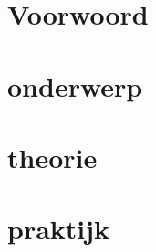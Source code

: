 \documentclass[titlepage,openbib]{book}
\begin{document}
\frontmatter


\tableofcontents
\listoffigures

\chapter{Voorwoord}


\mainmatter
\chapter{onderwerp}


\chapter{theorie}





\chapter{praktijk}

\end{document}
